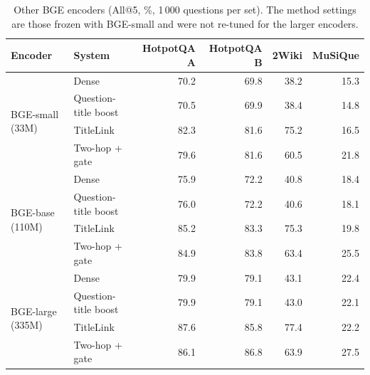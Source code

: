 \begin{table}[t]
\centering
\footnotesize
\caption{Other BGE encoders (All@5, \%, 1\,000 questions per set). The method settings are those frozen with BGE-small and were not re-tuned for the larger encoders.}
\label{tab:r6enc}
\begin{tabular}{llrrrr}
\toprule
Encoder & System & HotpotQA A & HotpotQA B & 2Wiki & MuSiQue \\
\midrule
\multirow{4}{*}{BGE-small (33M)} & Dense & 70.2 & 69.8 & 38.2 & 15.3 \\
 & Question-title boost & 70.5 & 69.9 & 38.4 & 14.8 \\
 & TitleLink & 82.3 & 81.6 & 75.2 & 16.5 \\
 & Two-hop + gate & 79.6 & 81.6 & 60.5 & 21.8 \\
\midrule
\multirow{4}{*}{BGE-base (110M)} & Dense & 75.9 & 72.2 & 40.8 & 18.4 \\
 & Question-title boost & 76.0 & 72.2 & 40.6 & 18.1 \\
 & TitleLink & 85.2 & 83.3 & 75.3 & 19.8 \\
 & Two-hop + gate & 84.9 & 83.8 & 63.4 & 25.5 \\
\midrule
\multirow{4}{*}{BGE-large (335M)} & Dense & 79.9 & 79.1 & 43.1 & 22.4 \\
 & Question-title boost & 79.9 & 79.1 & 43.0 & 22.1 \\
 & TitleLink & 87.6 & 85.8 & 77.4 & 22.2 \\
 & Two-hop + gate & 86.1 & 86.8 & 63.9 & 27.5 \\
\bottomrule
\end{tabular}
\end{table}
